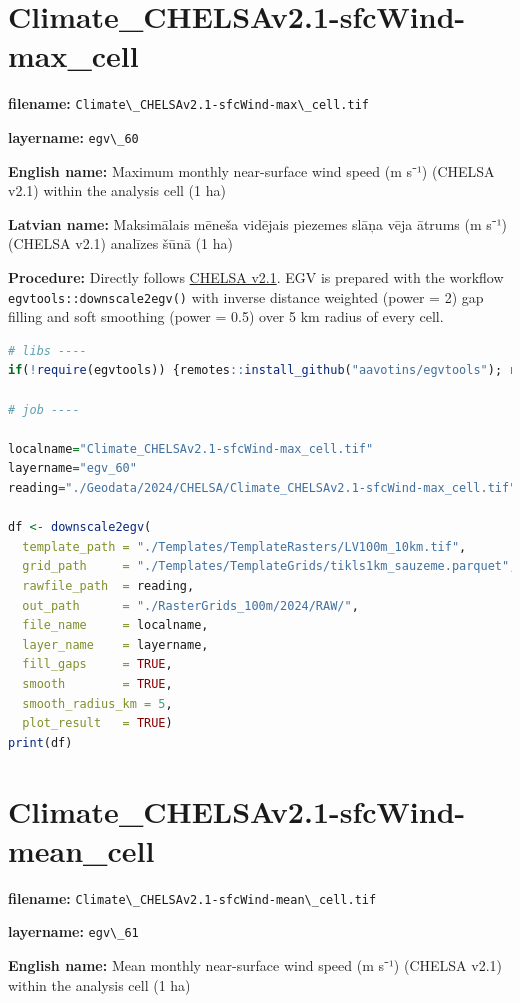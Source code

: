 \documentclass[
]{book}
\newcommand{\passthrough}[1]{#1}
\begin{document}
\section{Climate\_CHELSAv2.1-sfcWind-max\_cell}\label{ch06.060}

\textbf{filename:} \passthrough{\lstinline!Climate\_CHELSAv2.1-sfcWind-max\_cell.tif!}

\textbf{layername:} \passthrough{\lstinline!egv\_60!}

\textbf{English name:} Maximum monthly near-surface wind speed (m s⁻¹) (CHELSA v2.1) within the analysis cell (1 ha)

\textbf{Latvian name:} Maksimālais mēneša vidējais piezemes slāņa vēja ātrums (m s⁻¹) (CHELSA v2.1) analīzes šūnā (1 ha)

\textbf{Procedure:} Directly follows \hyperref[Ch04.11]{CHELSA v2.1}. EGV is prepared with the
workflow \passthrough{\lstinline!egvtools::downscale2egv()!} with inverse distance weighted (power = 2)
gap filling and soft smoothing (power = 0.5) over 5 km radius of every cell.

\begin{lstlisting}[language=R]
# libs ----
if(!require(egvtools)) {remotes::install_github("aavotins/egvtools"); require(egvtools)}

# job ----

localname="Climate_CHELSAv2.1-sfcWind-max_cell.tif"
layername="egv_60"
reading="./Geodata/2024/CHELSA/Climate_CHELSAv2.1-sfcWind-max_cell.tif"

df <- downscale2egv(
  template_path = "./Templates/TemplateRasters/LV100m_10km.tif",
  grid_path     = "./Templates/TemplateGrids/tikls1km_sauzeme.parquet",
  rawfile_path  = reading,
  out_path      = "./RasterGrids_100m/2024/RAW/",
  file_name     = localname,
  layer_name    = layername,
  fill_gaps     = TRUE,
  smooth        = TRUE,
  smooth_radius_km = 5,
  plot_result   = TRUE)
print(df)
\end{lstlisting}

\section{Climate\_CHELSAv2.1-sfcWind-mean\_cell}\label{ch06.061}

\textbf{filename:} \passthrough{\lstinline!Climate\_CHELSAv2.1-sfcWind-mean\_cell.tif!}

\textbf{layername:} \passthrough{\lstinline!egv\_61!}

\textbf{English name:} Mean monthly near-surface wind speed (m s⁻¹) (CHELSA v2.1) within the analysis cell (1 ha)
\end{document}
